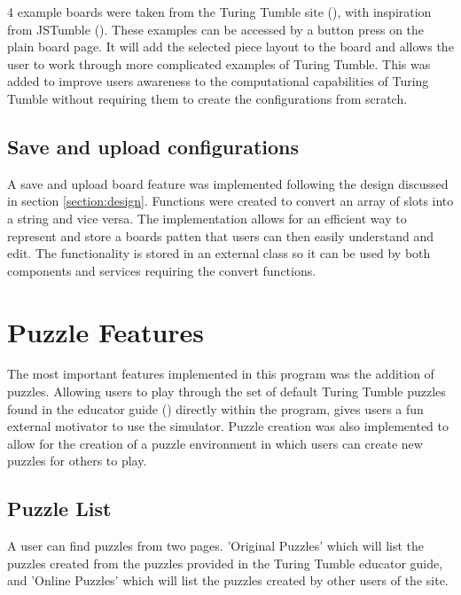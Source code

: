 \documentclass{l4proj}
\begin{document}
4 example boards were taken from the Turing Tumble site (\cite{turing_tumble_site}), with inspiration from JSTumble (\cite{jstumble}). These examples can be accessed by a button press on the plain board page. It will add the selected piece layout to the board and allows the user to work through more complicated examples of Turing Tumble. This was added to improve users awareness to the computational capabilities of Turing Tumble without requiring them to create the configurations from scratch. 

\subsection{Save and upload configurations}
A save and upload board feature was implemented following the design discussed in section \ref{section:design}. Functions were created to convert an array of slots into a string and vice versa. The implementation allows for an efficient way to represent and store a boards patten that users can then easily understand and edit. The functionality is stored in an external class so it can be used by both components and services requiring the convert functions.

\section{Puzzle Features}
The most important features implemented in this program was the addition of puzzles. Allowing users to play through the set of default Turing Tumble puzzles found in the educator guide (\cite{educator_resources}) directly within the program, gives users a fun external motivator to use the simulator. Puzzle creation was also implemented to allow for the creation of a puzzle environment in which users can create new puzzles for others to play.

\subsection{Puzzle List}
A user can find puzzles from two pages. 'Original Puzzles' which will list the puzzles created from the puzzles provided in the Turing Tumble educator guide, and 'Online Puzzles' which will list the puzzles created by other users of the site.
\end{document}

